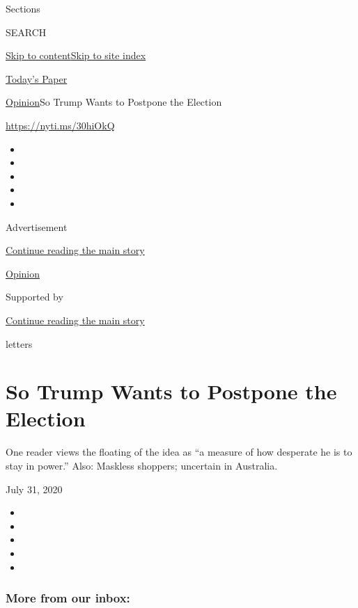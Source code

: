 Sections

SEARCH

\protect\hyperlink{site-content}{Skip to
content}\protect\hyperlink{site-index}{Skip to site index}

\href{https://myaccount.nytimes3xbfgragh.onion/auth/login?response_type=cookie\&client_id=vi}{}

\href{https://www.nytimes3xbfgragh.onion/section/todayspaper}{Today's
Paper}

\href{/section/opinion}{Opinion}\textbar{}So Trump Wants to Postpone the
Election

\url{https://nyti.ms/30hiOkQ}

\begin{itemize}
\item
\item
\item
\item
\item
\end{itemize}

Advertisement

\protect\hyperlink{after-top}{Continue reading the main story}

\href{/section/opinion}{Opinion}

Supported by

\protect\hyperlink{after-sponsor}{Continue reading the main story}

letters

\hypertarget{so-trump-wants-to-postpone-the-election}{%
\section{So Trump Wants to Postpone the
Election}\label{so-trump-wants-to-postpone-the-election}}

One reader views the floating of the idea as ``a measure of how
desperate he is to stay in power.'' Also: Maskless shoppers; uncertain
in Australia.

July 31, 2020

\begin{itemize}
\item
\item
\item
\item
\item
\end{itemize}

\hypertarget{more-from-our-inbox}{%
\subsubsection{More from our inbox:}\label{more-from-our-inbox}}

